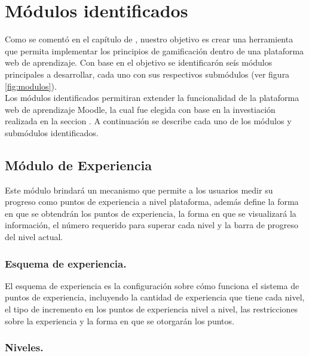
\section{Módulos identificados}
\label{analisis:modulos}

 Como se comentó en el capítulo de , nuestro
 objetivo es crear una herramienta que permita implementar los principios de
 gamificación dentro de una plataforma web de aprendizaje. Con base en el objetivo
 se identificarón seís módulos principales a desarrollar, cada uno con sus
 respectivos submódulos (ver figura \ref{fig:modulos}).\\

 \noindent
 Los módulos identificados permitiran extender la funcionalidad de la plataforma web
 de aprendizaje Moodle, la cual fue elegida con base en la investiación realizada en
 la seccion . A continuación se describe cada uno de los módulos y
 submódulos identificados.\\


\subsection{Módulo de Experiencia}
 \newcommand{\itemx}[1]{\item{\bf\color{primary}#1}}

 Este módulo brindará un mecanismo que permite a los usuarios medir su progreso
 como puntos de experiencia a nivel plataforma, además define la forma en que se
 obtendrán los puntos de experiencia, la forma en que se visualizará la información,
 el número requerido para superar cada nivel y la barra de progreso del nivel
 actual.

\subsubsection{Esquema de experiencia.}

 El esquema de experiencia es la configuración sobre cómo funciona el sistema
 de puntos de experiencia, incluyendo la cantidad de experiencia que tiene
 cada nivel, el tipo de incremento en los puntos de experiencia nivel a nivel,
 las restricciones sobre la experiencia y la forma en que se otorgarán los puntos.

\subsubsection{Niveles.}

